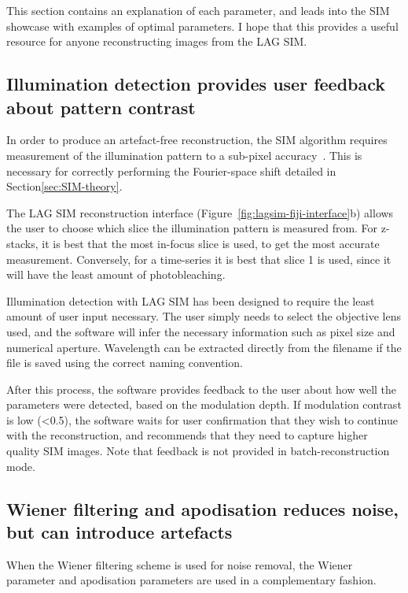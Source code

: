 This section contains an explanation of each parameter, and leads into the SIM showcase with examples of optimal parameters.
I hope that this provides a useful resource for anyone reconstructing images from the LAG SIM. 

\subsection{Illumination detection provides user feedback about pattern contrast}
In order to produce an artefact-free reconstruction, the SIM algorithm requires measurement of the illumination pattern to a sub-pixel accuracy~\cite{muller2016open}. 
This is necessary for correctly performing the Fourier-space shift detailed in Section\ref{sec:SIM-theory}. 

The LAG SIM reconstruction interface (Figure~\ref{fig:lagsim-fiji-interface}b) allows the user to choose which slice the illumination pattern is measured from. 
For z-stacks, it is best that the most in-focus slice is used, to get the most accurate measurement. 
Conversely, for a time-series it is best that slice 1 is used, since it will have the least amount of photobleaching. 

Illumination detection with LAG SIM has been designed to require the least amount of user input necessary. 
The user simply needs to select the objective lens used, and the software will infer the necessary information such as pixel size and numerical aperture. 
Wavelength can be extracted directly from the filename if the file is saved using the correct naming convention. 

After this process, the software provides feedback to the user about how well the parameters were detected, based on the modulation depth. 
If modulation contrast is low (<0.5), the software waits for user confirmation that they wish to continue with the reconstruction, and recommends that they need to capture higher quality SIM images. 
Note that feedback is not provided in batch-reconstruction mode. 

\subsection{Wiener filtering and apodisation reduces noise, but can introduce artefacts}
When the Wiener filtering scheme is used for noise removal, the Wiener parameter and apodisation parameters are used in a complementary fashion. 


